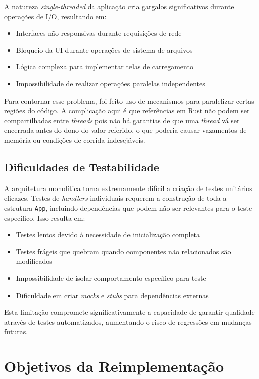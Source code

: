 A natureza \emph{single-threaded} da aplicação cria gargalos significativos durante operações de I/O, resultando em:

\begin{itemize}
    \item Interfaces não responsivas durante requisições de rede
    \item Bloqueio da UI durante operações de sistema de arquivos
    \item Lógica complexa para implementar telas de carregamento
    \item Impossibilidade de realizar operações paralelas independentes
\end{itemize}

Para contornar esse problema, foi feito uso de mecanismos para paralelizar certas regiões do código. A complicação aqui é que referências em Rust não podem ser compartilhadas entre \emph{threads} pois não há garantias de que uma \emph{thread} vá ser encerrada antes do dono do valor referido, o que poderia causar vazamentos de memória ou condições de corrida indesejáveis.

\subsection{Dificuldades de Testabilidade}

A arquitetura monolítica torna extremamente difícil a criação de testes unitários eficazes. Testes de \emph{handlers} individuais requerem a construção de toda a estrutura \texttt{App}, incluindo dependências que podem não ser relevantes para o teste específico. Isso resulta em:

\begin{itemize}
    \item Testes lentos devido à necessidade de inicialização completa
    \item Testes frágeis que quebram quando componentes não relacionados são modificados
    \item Impossibilidade de isolar comportamento específico para teste
    \item Dificuldade em criar \emph{mocks} e \emph{stubs} para dependências externas
\end{itemize}

Esta limitação compromete significativamente a capacidade de garantir qualidade através de testes automatizados, aumentando o risco de regressões em mudanças futuras.

\section{Objetivos da Reimplementação}

